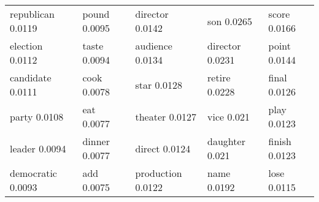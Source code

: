 \documentclass[11pt]{report}
\begin{document}
\begin{table}[!hbt]
\begin{tabular}{| l | l | l |l|l|}
                             republican 0.0119 & pound 0.0095 & director 0.0142 & son 0.0265 & score 0.0166 \\
                          election 0.0112 & taste 0.0094 & audience 0.0134 & director 0.0231 & point 0.0144 \\
                                candidate 0.0111 & cook 0.0078 & star 0.0128 & retire 0.0228 & final 0.0126 \\
                                      party 0.0108 & eat 0.0077 & theater 0.0127 & vice 0.021 & play 0.0123 \\
                             leader 0.0094 & dinner 0.0077 & direct 0.0124 & daughter 0.021 & finish 0.0123 \\
                             democratic 0.0093 & add 0.0075 & production 0.0122 & name 0.0192 & lose 0.0115 \\
\bottomrule
\end{tabular}
\end{table}
\end{document}
